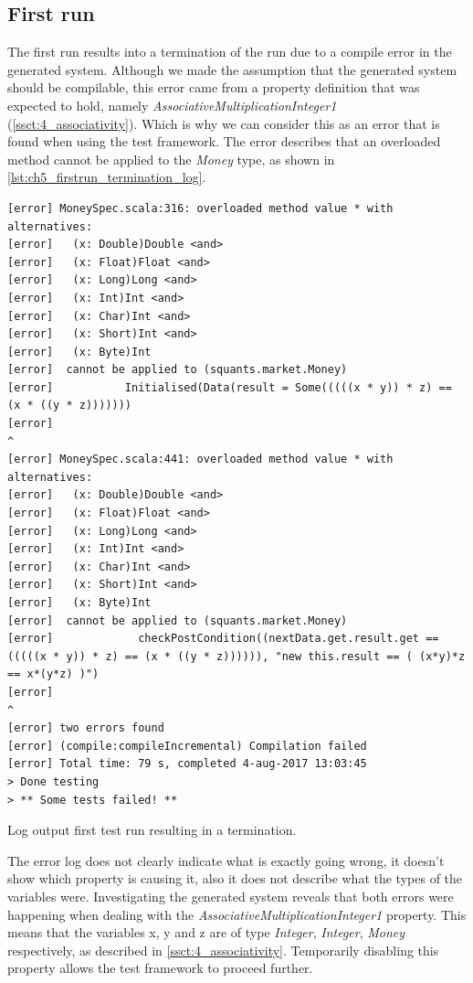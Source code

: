 \subsection{First run}
The first run results into a termination of the run due to a compile error in the generated system. Although we made the assumption that the generated system should be compilable, this error came from a property definition that was expected to hold, namely \textit{AssociativeMultiplicationInteger1} (\autoref{ssct:4_associativity}). Which is why we can consider this as an error that is found when using the test framework. The error describes that an overloaded method cannot be applied to the \textit{Money} type, as shown in \autoref{lst:ch5_firstrun_termination_log}.
\FloatBarrier
\begin{sourcecode}[!ht]
\begin{lstlisting}[language=Log]
[error] MoneySpec.scala:316: overloaded method value * with alternatives:
[error]   (x: Double)Double <and>
[error]   (x: Float)Float <and>
[error]   (x: Long)Long <and>
[error]   (x: Int)Int <and>
[error]   (x: Char)Int <and>
[error]   (x: Short)Int <and>
[error]   (x: Byte)Int
[error]  cannot be applied to (squants.market.Money)
[error]           Initialised(Data(result = Some(((((x * y)) * z) == (x * ((y * z)))))))
[error]                                                                 ^
[error] MoneySpec.scala:441: overloaded method value * with alternatives:
[error]   (x: Double)Double <and>
[error]   (x: Float)Float <and>
[error]   (x: Long)Long <and>
[error]   (x: Int)Int <and>
[error]   (x: Char)Int <and>
[error]   (x: Short)Int <and>
[error]   (x: Byte)Int
[error]  cannot be applied to (squants.market.Money)
[error]             checkPostCondition((nextData.get.result.get == (((((x * y)) * z) == (x * ((y * z)))))), "new this.result == ( (x*y)*z == x*(y*z) )")
[error]                                                                                    ^
[error] two errors found
[error] (compile:compileIncremental) Compilation failed
[error] Total time: 79 s, completed 4-aug-2017 13:03:45
> Done testing
> ** Some tests failed! **
\end{lstlisting}
\caption{Log output first test run resulting in a termination.}
\label{lst:ch5_firstrun_termination_log}
\end{sourcecode}
\FloatBarrier
The error log does not clearly indicate what is exactly going wrong, it doesn't show which property is causing it, also it does not describe what the types of the variables were. Investigating the generated system reveals that both errors were happening when dealing with the \textit{AssociativeMultiplicationInteger1} property. This means that the variables x, y and z are of type \textit{Integer}, \textit{Integer}, \textit{Money} respectively, as described in \autoref{ssct:4_associativity}. Temporarily disabling this property allows the test framework to proceed further.


